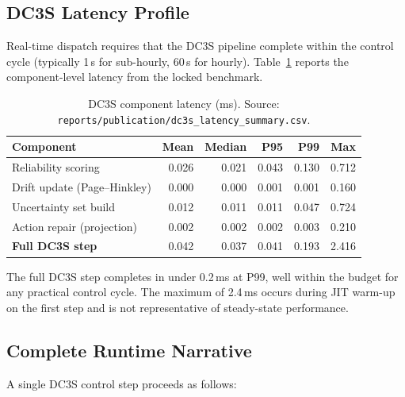 \subsection{DC3S Latency Profile}

Real-time dispatch requires that the DC3S pipeline complete within the
control cycle (typically 1\,s for sub-hourly, 60\,s for hourly).
Table~\ref{tab:dc3s-latency} reports the component-level latency from the
locked benchmark.

\begin{table}[ht]
\centering
\caption{DC3S component latency (ms).  Source:
\texttt{reports/publication/dc3s\_latency\_summary.csv}.}
\label{tab:dc3s-latency}
\begin{tabular}{lrrrrr}
\toprule
\textbf{Component} & \textbf{Mean} & \textbf{Median} & \textbf{P95} &
  \textbf{P99} & \textbf{Max} \\
\midrule
Reliability scoring          & 0.026 & 0.021 & 0.043 & 0.130 & 0.712 \\
Drift update (Page--Hinkley) & 0.000 & 0.000 & 0.001 & 0.001 & 0.160 \\
Uncertainty set build        & 0.012 & 0.011 & 0.011 & 0.047 & 0.724 \\
Action repair (projection)   & 0.002 & 0.002 & 0.002 & 0.003 & 0.210 \\
\midrule
\textbf{Full DC3S step}      & 0.042 & 0.037 & 0.041 & 0.193 & 2.416 \\
\bottomrule
\end{tabular}
\end{table}

The full DC3S step completes in under 0.2\,ms at P99, well within the
budget for any practical control cycle.  The maximum of 2.4\,ms occurs
during JIT warm-up on the first step and is not representative of
steady-state performance.

\subsection{Complete Runtime Narrative}
\label{sec:runtime-narrative}

A single DC3S control step proceeds as follows:

